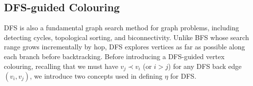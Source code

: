 


\subsection{DFS-guided Colouring}
DFS is also a fundamental graph search method for graph problems, including detecting cycles, topological sorting, and biconnectivity.
Unlike BFS whose search range grows incrementally by hop, DFS explores vertices as far as possible along each branch before backtracking. 
Before introducing a DFS-guided vertex colouring, recalling that we must have $v_j\prec v_i$ (or $i>j$) for any DFS back edge $(v_i, v_j)$, we introduce two concepts used in defining $\eta$ for DFS. 


